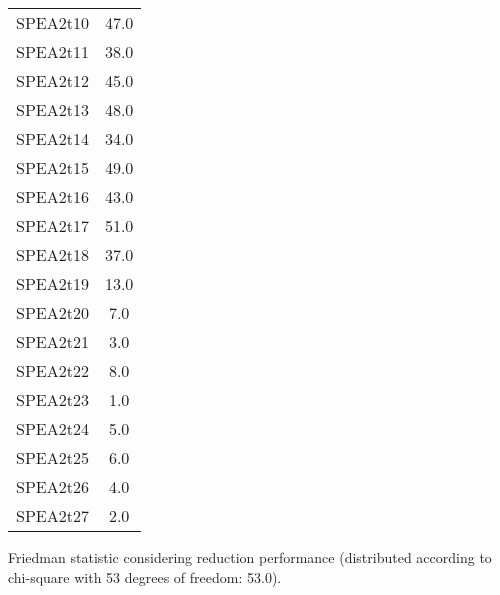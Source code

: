 \documentclass{article}
\begin{document}
\begin{table}[!htp]
\begin{tabular}{c|c}
SPEA2t10&47.0\\
SPEA2t11&38.0\\
SPEA2t12&45.0\\
SPEA2t13&48.0\\
SPEA2t14&34.0\\
SPEA2t15&49.0\\
SPEA2t16&43.0\\
SPEA2t17&51.0\\
SPEA2t18&37.0\\
SPEA2t19&13.0\\
SPEA2t20&7.0\\
SPEA2t21&3.0\\
SPEA2t22&8.0\\
SPEA2t23&1.0\\
SPEA2t24&5.0\\
SPEA2t25&6.0\\
SPEA2t26&4.0\\
SPEA2t27&2.0\\
\end{tabular}
\end{table}


Friedman statistic considering reduction performance (distributed according to chi-square with 53 degrees of freedom: 53.0).
\end{document}
